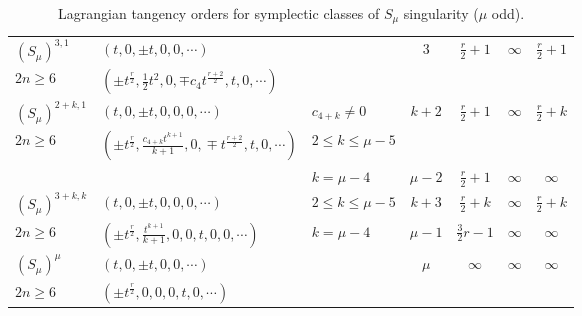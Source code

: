 \documentclass{amsart}
\theoremstyle{definition}
\numberwithin{equation}{section}
\begin{document}
\begin{center}
\begin{table}[h]
\begin{small}
\begin{tabular}{|p{1.3cm}|p{4.7cm}|p{2.3cm}|c|c|c|c|}
  $(S_{\mu})^{3,1}$  & $(t,0,\pm t,0, 0,\cdots)$ &   & $3$ & $\frac{r}{2}\!+\!1$ & $\infty$ & $\frac{r}{2}\!+\!1$   \\
 $2n\ge 6$  & $(\pm t^{\frac{r}{2}},\frac{1}{2}t^2,0,\mp c_4t^{\frac{r+2}{2}},t, 0,\cdots)$ &  &  &  &  &  \\ \hline

$(S_{\mu})^{2+\!k,1}$ & $(t,0,\pm t,0,0, 0, \cdots)$ & $c_{4+k}\ne 0$ & $k\!+\!2$ & $\frac{r}{2}\!+\!1$ & $\infty$ & $\frac{r}{2}\!+\!k$ \\ 
    $2n\ge 6$ & $(\pm\!t^\frac{r}{2}\!,\frac{c_{4+k}t^{k+1}}{k+1},\!0,\!\mp t^{\frac{r+2}{2}}\!,t\!,\!0,\! \cdots)$ & $2\!\leq k \leq \mu\! -5$  &   &  &  &  \\ \cline{3-7}
      &     &   $k=\mu-4$ & $\mu\!-\!2$ &  $\frac{r}{2}\!+\!1$ & $\infty$ & $\infty$ \\   \hline

     $(S_{\mu})^{3+k,k}$ & $(t,0, \pm t,0,0, 0, \cdots)$ & $2\!\leq k \leq \mu\! -5$ & $\!k\!+3$ & $\frac{r}{2}\!+\!k$ & $\infty$ & $\frac{r}{2}\!+\!k$ \\ \cline{3-7}
    $2n\ge 6$ & $(\pm t^{\frac{r}{2}},\frac{t^{k+1}}{k+1}, 0, 0, t, 0, 0, \cdots)$ & $k=\mu-4$ & $\mu\!-\!1$ &  $\frac{3}{2}r\!-\!1$ & $\infty$ & $\infty$ \\   \hline

    $(S_{\mu})^{\mu}$  & $(t, 0,\pm t,0, 0,\cdots)$ &   & $\mu$ & $\infty$ & $\infty$ & $\infty$   \\ 
$2n\ge 6$  & $(\pm t^{\frac{r}{2}}, 0, 0 , 0, t,0 ,\cdots)$ &  &  &  &  &  \\ \hline
\end{tabular}

\smallskip

\caption{\small Lagrangian tangency orders for symplectic classes of $S_{\mu}$ singularity ($\mu$ odd).}\label{tabsodd-lagr}

\end{small}
\end{table}
\end{center}
\medskip
\end{document}
